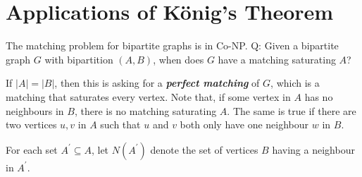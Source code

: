 \section{Applications of König's Theorem}
The matching problem for bipartite graphs is in Co-NP.
Q: Given a bipartite graph $ G $ with bipartition $ (A,B) $,
when does $ G $ have a matching saturating $ A $?

If $ |A|=|B| $, then this is asking for a \textbf{\emph{perfect matching}} of $ G $,
which is a matching that saturates every vertex. Note that,
if some vertex in $ A $ has no neighbours in $ B $, there is no matching saturating $ A $.
The same is true if there are two vertices $ u,v $ in $ A $ such that $ u $ and $ v $
both only have one neighbour $ w $ in $ B $.

For each set $ A^\prime \subseteq A $, let $ N(A^\prime) $ denote the set of vertices
$ B $ having a neighbour in $ A^\prime $.

